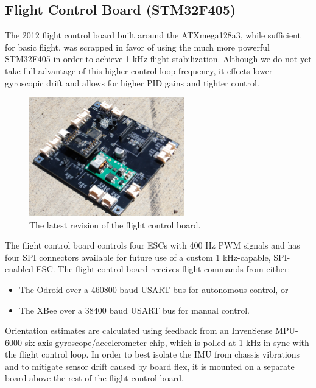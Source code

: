 \documentclass[12pt,letterpaper]{article} \usepackage[margin=1in]{geometry}
\begin{document}
\subsection*{Flight Control Board (STM32F405)}

The 2012 flight control board built around the ATXmega128a3, while sufficient
for basic flight, was scrapped in favor of using the much more powerful
STM32F405 in order to achieve 1 kHz flight stabilization. Although we do not
yet take full advantage of this higher control loop frequency, it effects lower
gyroscopic drift and allows for higher PID gains and tighter control.

\begin{figure}[!h]
	\centering
	\includegraphics[width=0.6\textwidth]{img/flight_control.jpg}
	\caption{The latest revision of the flight control board.}
	\label{fig:fcboard}
\end{figure}

The flight control board controls four ESCs with 400 Hz PWM signals and has
four SPI connectors available for future use of a custom 1 kHz-capable,
SPI-enabled ESC. The flight control board receives flight commands from either:

\begin{itemize}
	\item The Odroid over a 460800 baud USART bus for autonomous control, or
	\item The XBee over a 38400 baud USART bus for manual control.
\end{itemize}

Orientation estimates are calculated using feedback from an InvenSense MPU-6000
six-axis gyroscope/accelerometer chip, which is polled at 1 kHz in sync with
the flight control loop. In order to best isolate the IMU from chassis
vibrations and to mitigate sensor drift caused by board flex, it is mounted on
a separate board above the rest of the flight control board.
\end{document}
